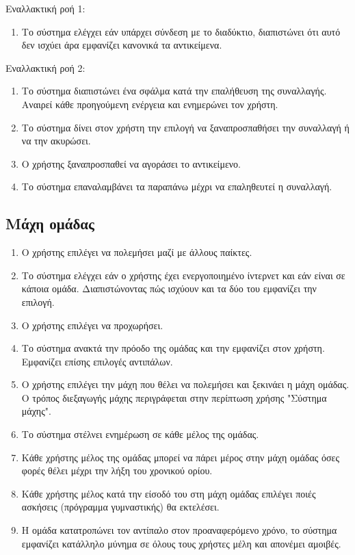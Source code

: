 Εναλλακτική ροή 1:
\begin{enumerate}[label=3.\alph*.,ref=3.\alph*]
    \item Το σύστημα ελέγχει εάν υπάρχει σύνδεση με το διαδύκτιο, διαπιστώνει ότι αυτό δεν ισχύει άρα εμφανίζει κανονικά τα αντικείμενα.
\end{enumerate}

Εναλλακτική ροή 2:
\begin{enumerate}[label=7.\alph*.,ref=7.\alph*]
    \item Το σύστημα διαπιστώνει ένα σφάλμα κατά την επαλήθευση της συναλλαγής. Αναιρεί κάθε προηγούμενη ενέργεια και ενημερώνει τον χρήστη. 
    \item Το σύστημα δίνει στον χρήστη την επιλογή να ξαναπροσπαθήσει την συναλλαγή ή να την ακυρώσει.
    \item Ο χρήστης ξαναπροσπαθεί να αγοράσει το αντικείμενο.
    \item Το σύστημα επαναλαμβάνει τα παραπάνω μέχρι να επαληθευτεί η συναλλαγή.
\end{enumerate}

\newpage
\subsection{Μάχη ομάδας}
\label{sec:clanbattle}
\begin{enumerate}
\item Ο χρήστης επιλέγει να πολεμήσει μαζί με άλλους παίκτες.
\item Το σύστημα ελέγχει εάν ο χρήστης έχει ενεργοποιημένο ίντερνετ και εάν είναι σε κάποια ομάδα. Διαπιστώνοντας πώς ισχύουν και τα δύο του εμφανίζει την επιλογή.
\item Ο χρήστης επιλέγει να προχωρήσει.
\item Το σύστημα ανακτά την πρόοδο της ομάδας και την εμφανίζει στον χρήστη. Εμφανίζει επίσης επιλογές αντιπάλων.
\item Ο χρήστης επιλέγει την μάχη που θέλει να πολεμήσει και ξεκινάει η μάχη ομάδας. Ο τρόπος διεξαγωγής μάχης περιγράφεται στην περίπτωση χρήσης "Σύστημα μάχης".
\item Το σύστημα στέλνει ενημέρωση σε κάθε μέλος της ομάδας.
\item Κάθε χρήστης μέλος της ομάδας μπορεί να πάρει μέρος στην μάχη ομάδας όσες φορές θέλει μέχρι την λήξη του χρονικού ορίου.
\item Κάθε χρήστης μέλος κατά την είσοδό του στη μάχη ομάδας επιλέγει ποιές ασκήσεις (πρόγραμμα γυμναστικής) θα εκτελέσει.
\item Η ομάδα κατατροπώνει τον αντίπαλο στον προαναφερόμενο χρόνο, το σύστημα εμφανίζει κατάλληλο μύνημα σε όλους τους χρήστες μέλη και απονέμει αμοιβές.
\end{enumerate}


